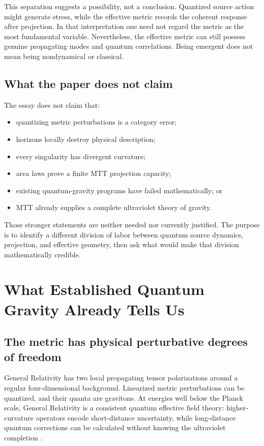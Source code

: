 \documentclass[11pt]{article}
\begin{document}
This separation suggests a possibility, not a conclusion.  Quantized source
action might generate stress, while the effective metric records the coherent
response after projection.  In that interpretation one need not regard the
metric as the most fundamental variable.  Nevertheless, the effective metric
can still possess genuine propagating modes and quantum correlations.  Being
emergent does not mean being nondynamical or classical.

\subsection{What the paper does not claim}

The essay does not claim that:
\begin{itemize}
\item quantizing metric perturbations is a category error;
\item horizons locally destroy physical description;
\item every singularity has divergent curvature;
\item area laws prove a finite MTT projection capacity;
\item existing quantum-gravity programs have failed mathematically; or
\item MTT already supplies a complete ultraviolet theory of gravity.
\end{itemize}
Those stronger statements are neither needed nor currently justified.  The
purpose is to identify a different division of labor between quantum source
dynamics, projection, and effective geometry, then ask what would make that
division mathematically credible.

\section{What Established Quantum Gravity Already Tells Us}

\subsection{The metric has physical perturbative degrees of freedom}

General Relativity has two local propagating tensor polarizations around a
regular four-dimensional background.  Linearized metric perturbations can be
quantized, and their quanta are gravitons.  At energies well below the Planck
scale, General Relativity is a consistent quantum effective field theory:
higher-curvature operators encode short-distance uncertainty, while
long-distance quantum corrections can be calculated without knowing the
ultraviolet completion \cite{Donoghue}.
\end{document}
